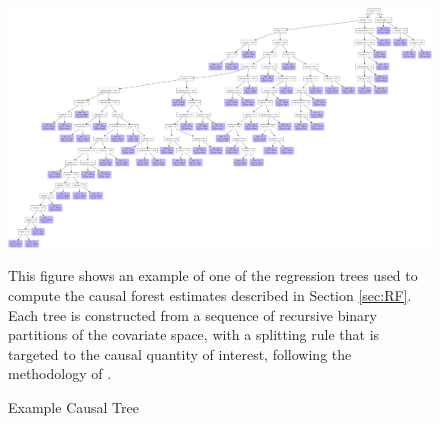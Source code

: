 \begin{figure}[H]
        \caption{Example Causal Tree}
    \label{causal_tree1}
    \begin{center}
        \centering
        \includegraphics[width=\textwidth]{Figuras/crf_pro_2_apr.pdf}
    \end{center}
    \footnotesize 
    This figure shows an example of one of the regression trees used to compute the causal forest estimates described in Section \ref{sec:RF}. Each tree is constructed from a sequence of recursive binary partitions of the covariate space, with a splitting rule that is targeted to the causal quantity of interest, following the methodology of \cite{atheygrf}.
\end{figure}



